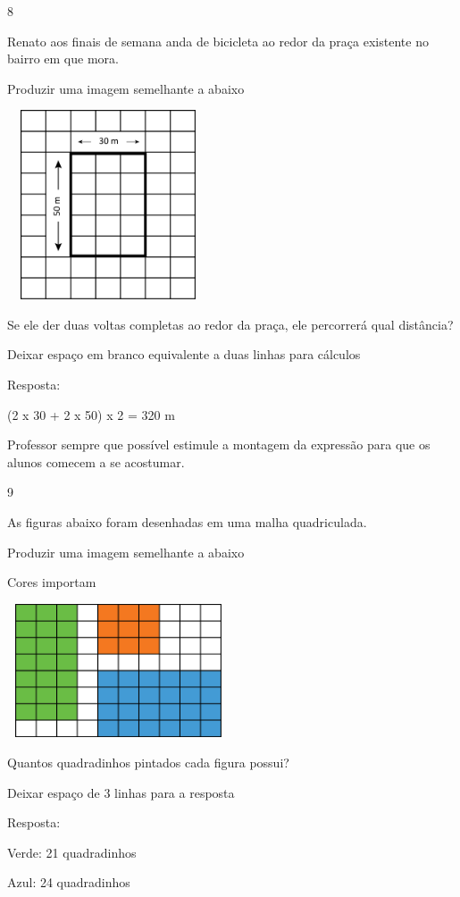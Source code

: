 \begin{escolha}
\num{8}

Renato aos finais de semana anda de bicicleta ao redor da praça
existente no bairro em que mora.

Produzir uma imagem semelhante a abaixo

\includegraphics[width=2.35256in,height=2.20730in]{media/image55.png}

Se ele der duas voltas completas ao redor da praça, ele percorrerá qual
distância?

Deixar espaço em branco equivalente a duas linhas para cálculos

Resposta:

(2 x 30 + 2 x 50) x 2 = 320 m

Professor sempre que possível estimule a montagem da expressão para que
os alunos comecem a se acostumar.

\num{9}

As figuras abaixo foram desenhadas em uma malha quadriculada.

Produzir uma imagem semelhante a abaixo

Cores importam

\includegraphics[width=2.59189in,height=1.55847in]{media/image56.png}

Quantos quadradinhos pintados cada figura possui?

Deixar espaço de 3 linhas para a resposta

Resposta:

Verde: 21 quadradinhos

Azul: 24 quadradinhos


\end{escolha}
